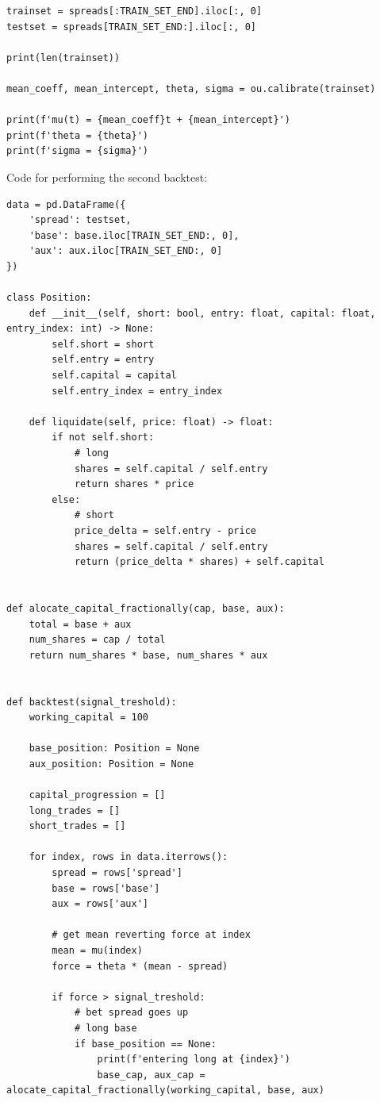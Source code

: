 \documentclass{article}
\begin{document}
\begin{spacing}{2.0}
\begin{lstlisting}
trainset = spreads[:TRAIN_SET_END].iloc[:, 0]
testset = spreads[TRAIN_SET_END:].iloc[:, 0]

print(len(trainset))

mean_coeff, mean_intercept, theta, sigma = ou.calibrate(trainset)

print(f'mu(t) = {mean_coeff}t + {mean_intercept}')
print(f'theta = {theta}')
print(f'sigma = {sigma}')
\end{lstlisting}

Code for performing the second backtest:

\begin{lstlisting}
data = pd.DataFrame({
    'spread': testset,
    'base': base.iloc[TRAIN_SET_END:, 0],
    'aux': aux.iloc[TRAIN_SET_END:, 0]
})

class Position:
    def __init__(self, short: bool, entry: float, capital: float, entry_index: int) -> None:
        self.short = short
        self.entry = entry
        self.capital = capital
        self.entry_index = entry_index

    def liquidate(self, price: float) -> float:
        if not self.short:
            # long
            shares = self.capital / self.entry
            return shares * price
        else:
            # short
            price_delta = self.entry - price
            shares = self.capital / self.entry
            return (price_delta * shares) + self.capital


def alocate_capital_fractionally(cap, base, aux):
    total = base + aux
    num_shares = cap / total
    return num_shares * base, num_shares * aux


def backtest(signal_treshold):
    working_capital = 100

    base_position: Position = None
    aux_position: Position = None

    capital_progression = []
    long_trades = []
    short_trades = []

    for index, rows in data.iterrows():
        spread = rows['spread']
        base = rows['base']
        aux = rows['aux']

        # get mean reverting force at index
        mean = mu(index)
        force = theta * (mean - spread)

        if force > signal_treshold:
            # bet spread goes up
            # long base
            if base_position == None:
                print(f'entering long at {index}')
                base_cap, aux_cap = alocate_capital_fractionally(working_capital, base, aux)


\end{lstlisting}
\end{spacing}
\end{document}
